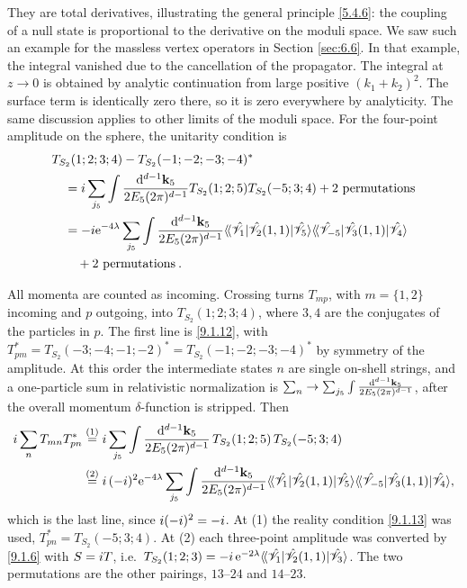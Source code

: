 They are total derivatives, illustrating the general principle \eqref{5.4.6}: the coupling of a null state is proportional to the derivative on the moduli space. We saw such an example for the massless vertex operators in Section \ref{sec:6.6}. 
In that example, the integral vanished due to the cancellation of the propagator. The integral at $z \rightarrow 0$ is obtained by analytic continuation from large positive $(k_{1} + k_{2})^{2}$. 
The surface term is identically zero there, so it is zero everywhere by analyticity. The same discussion applies to other limits of the moduli space.
For the four-point amplitude on the sphere, the unitarity condition is
\begin{align}
	& T_{S_{2}}(1; 2; 3; 4) - T_{S_{2}}(-1; -2; -3; -4)^{*} \nonumber \\
	& \quad = i \sum_{j_{5}} \int \frac{\mathrm{d}^{d-1} \mathbf{k}_{5}}{2 E_{5}(2 \pi)^{d-1}} T_{S_{2}}(1; 2; 5) T_{S_{2}}(-5; 3; 4)
	+ \text{2 permutations} \nonumber \\
	& \quad = -i \mathrm{e}^{-4 \lambda} \sum_{j_{5}} \int \frac{\mathrm{d}^{d-1} \mathbf{k}_{5}}{2 E_{5}(2 \pi)^{d-1}}
	\langle\!\langle\hat{\mathscr{V}}_{1} |\hat{\mathscr{V}}_{2}(1,1)|
	\hat{\mathscr{V}}_{5}\rangle 
	\langle\!\langle\hat{\mathscr{V}}_{-5}|\hat{\mathscr{V}}_{3}(1,1)| \hat{\mathscr{V}}_{4}\rangle  \nonumber \\
	& \qquad + \text{2 permutations} \: .
	\label{9.1.24}
\end{align}
\begin{tcolorbox}[breakable]
	\begin{remark}
		All momenta are counted as incoming. Crossing turns $T_{mp}$, with $m=\{1,2\}$ incoming and $p$ outgoing, into $T_{S_2}(1;2;3;4)$, where $3,4$ are the conjugates of the particles in $p$. The first line is \eqref{9.1.12}, with $T_{pm}^{*}=T_{S_2}(-3;-4;-1;-2)^{*}=T_{S_2}(-1;-2;-3;-4)^{*}$ by symmetry of the amplitude. At this order the intermediate states $n$ are single on-shell strings, and a one-particle sum in relativistic normalization is $\sum_n\to\sum_{j_5}\int\frac{\mathrm{d}^{d-1}\mathbf k_5}{2E_5(2\pi)^{d-1}}$, after the overall momentum $\delta$-function is stripped. Then
		\begin{align*}
			i\sum_nT_{mn}T^{*}_{pn}
			&\overset{(1)}{=} i\sum_{j_5}\int\frac{\mathrm{d}^{d-1}\mathbf k_5}{2E_5(2\pi)^{d-1}}\,T_{S_2}(1;2;5)\,T_{S_2}(-5;3;4)\\
			&\overset{(2)}{=} i\,(-i)^2\mathrm{e}^{-4\lambda}\sum_{j_5}\int\frac{\mathrm{d}^{d-1}\mathbf k_5}{2E_5(2\pi)^{d-1}}
			\langle\!\langle\hat{\mathscr V}_1|\hat{\mathscr V}_2(1,1)|\hat{\mathscr V}_5\rangle\langle\!\langle\hat{\mathscr V}_{-5}|\hat{\mathscr V}_3(1,1)|\hat{\mathscr V}_4\rangle ,
		\end{align*}
		which is the last line, since $i(-i)^2=-i$. At (1) the reality condition \eqref{9.1.13} was used, $T_{pn}^{*}=T_{S_2}(-5;3;4)$. At (2) each three-point amplitude was converted by \eqref{9.1.6} with $S=i T$, i.e.\ $T_{S_2}(1;2;3)=-i\,\mathrm{e}^{-2\lambda}\langle\!\langle\hat{\mathscr V}_1|\hat{\mathscr V}_2(1,1)|\hat{\mathscr V}_3\rangle$. The two permutations are the other pairings, $13$--$24$ and $14$--$23$.
	\end{remark}
\end{tcolorbox}

